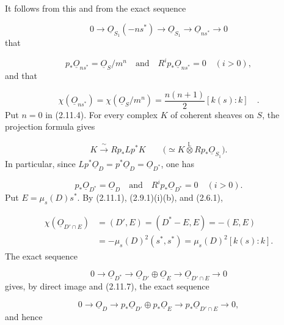 
It follows from this and from the exact sequence

\begin{equation*}
0\longrightarrow\underline{O}_{S_1}(-ns^*)
\longrightarrow\underline{O}_{S_1}
\longrightarrow\underline{O}_{ns^*}
\longrightarrow0
\end{equation*}
that

\begin{equation}\tag{2.11.5}
p_*\underline{O}_{ns^*}=\underline{O}_S/m^n
\quad\text{and}\quad
R^ip_*\underline{O}_{ns^*}=0\quad(i>0),
\end{equation}
and that

\begin{equation}\tag{2.11.6}
\chi(\underline{O}_{ns^*})
=\chi(\underline{O}_S/m^n)
=\frac{n(n+1)}2[k(s):k] \quad .
\end{equation}
Put $n=0$ in (2.11.4).  For every complex $K$ of coherent sheaves on $S$, the
projection formula gives

\begin{equation*}
K\xrightarrow{\;\sim\;}Rp_*Lp^*K
\qquad
\bigl(\simeq K\overset{\mathbb L}{\otimes}Rp_*\underline{O}_{S_1}\bigr).
\end{equation*}
In particular, since
$Lp^*\underline{O}_D=p^*\underline{O}_D=\underline{O}_{D^*}$, one has

\begin{equation}\tag{2.11.7}
p_*\underline{O}_{D^*}=\underline{O}_D
\quad\text{and}\quad
R^ip_*\underline{O}_{D^*}=0\quad(i>0).
\end{equation}
Put $E=\mu_s(D)s^*$.  By (2.11.1), (2.9.1)(i)(b), and (2.6.1),

\begin{equation}\tag{2.11.8}
\begin{aligned}
\chi(\underline{O}_{D'\cap E})
&=(D',E)=(D^*-E,E)=-(E,E)\\
&=-\mu_s(D)^2(s^*,s^*)
=\mu_s(D)^2[k(s):k].
\end{aligned}
\end{equation}
The exact sequence

\begin{equation*}
0\longrightarrow\underline{O}_{D^*}
\longrightarrow\underline{O}_{D'}\oplus\underline{O}_E
\longrightarrow\underline{O}_{D'\cap E}
\longrightarrow0
\end{equation*}
gives, by direct image and (2.11.7), the exact sequence

\begin{equation*}
0\longrightarrow\underline{O}_D
\longrightarrow p_*\underline{O}_{D'}\oplus p_*\underline{O}_E
\longrightarrow p_*\underline{O}_{D'\cap E}
\longrightarrow0,
\end{equation*}
and hence

